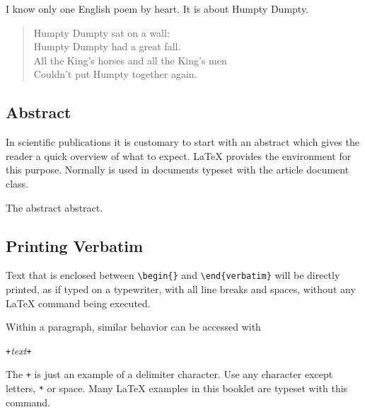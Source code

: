 \begin{example}
I know only one English poem by
heart. It is about Humpty Dumpty.
\begin{flushleft}
\begin{verse}
Humpty Dumpty sat on a wall:\\
Humpty Dumpty had a great fall.\\
All the King's horses and all
the King's men\\
Couldn't put Humpty together
again.
\end{verse}
\end{flushleft}
\end{example}

\subsection{Abstract}

In scientific publications it is customary to start with an abstract which
gives the reader a quick overview of what to expect. \LaTeX{} provides the
 environment for this purpose. Normally  is used
in documents typeset with the article document class.

\newenvironment{abstract}%
        {\begin{center}\begin{small}\begin{minipage}{0.8\textwidth}}%
        {\end{minipage}\end{small}\end{center}}
\begin{example}
\begin{abstract}
The abstract abstract.
\end{abstract}
\end{example}

\subsection{Printing Verbatim}

Text that is enclosed between \verb|\begin{|\verb|}| and
\verb|\end{verbatim}| will be directly printed, as if typed on a
typewriter, with all line breaks and spaces, without any \LaTeX{}
command being executed.

Within a paragraph, similar behavior can be accessed with
\begin{lscommand}
\verb|+|\emph{text}\verb|+|
\end{lscommand}
\noindent The \verb|+| is just an example of a delimiter character. Use any
character except letters, \verb|*| or space. Many \LaTeX{} examples in this
booklet are typeset with this command.

